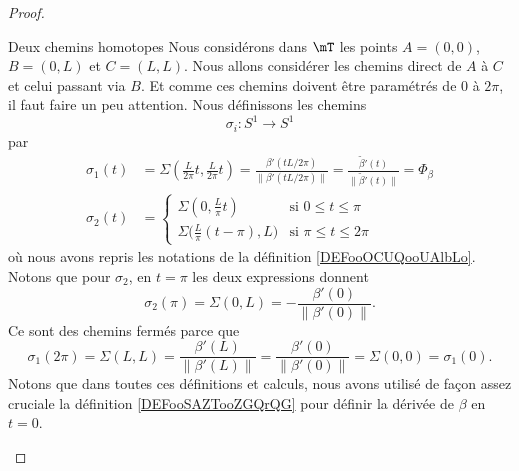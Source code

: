 \begin{proof}
\begin{subproof}
    \item[Deux chemins homotopes]
            Nous considérons dans \( \mT\) les points \( A=(0,0)\), \( B=(0,L)\) et \( C=(L,L)\). Nous allons considérer les chemins direct de \( A\) à \( C\) et celui passant via \( B\). Et comme ces chemins doivent être paramétrés de \( 0\) à \( 2 \pi\), il faut faire un peu attention. Nous définissons les chemins 
            \begin{equation}
                \sigma_i\colon S^1\to S^1
            \end{equation}
            par
            \begin{subequations}
                \begin{align}
                    \sigma_1(t)&=\Sigma\left( \frac{ L }{ 2\pi }t,\frac{ L }{ 2\pi }t \right)=\frac{ \beta'(tL/2\pi) }{ \| \beta'(tL/2\pi) \| }=\frac{ \tilde \beta'(t) }{ \|\tilde  \beta'(t) \| }=\Phi_{\beta}\\
                    \sigma_2(t)&=\begin{cases}
                        \Sigma(0,\frac{ L }{ \pi }t)    &   \text{si } 0\leq t\leq \pi\\
                        \Sigma\big( \frac{ L }{ \pi }(t-\pi),L  \big)    &    \text{si }\pi\leq t\leq 2\pi
                    \end{cases}
                \end{align}
            \end{subequations}
            où nous avons repris les notations de la définition \ref{DEFooOCUQooUAlbLo}. Notons que pour \( \sigma_2\), en \( t=\pi\) les deux expressions donnent
            \begin{equation}
                \sigma_2(\pi)=\Sigma(0,L)=-\frac{ \beta'(0) }{ \| \beta'(0) \| }.
            \end{equation}
            Ce sont des chemins fermés parce que
            \begin{equation}
                \sigma_1(2\pi)=\Sigma(L,L)=\frac{ \beta'(L) }{ \| \beta'(L) \| }=\frac{ \beta'(0) }{ \| \beta'(0) \| }=\Sigma(0,0)=\sigma_1(0).
            \end{equation}
            Notons que dans toutes ces définitions et calculs, nous avons utilisé de façon assez cruciale la définition \ref{DEFooSAZTooZGQrQG} pour définir la dérivée de \( \beta\) en \( t=0\).


\end{subproof}
\end{proof}
